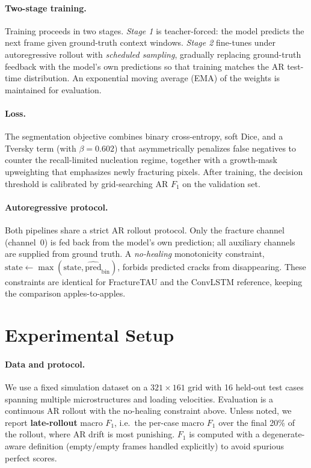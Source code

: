 \documentclass[11pt]{article}
\begin{document}
\paragraph{Two-stage training.}
Training proceeds in two stages. \emph{Stage 1} is teacher-forced: the model
predicts the next frame given ground-truth context windows. \emph{Stage 2}
fine-tunes under autoregressive rollout with \emph{scheduled sampling}, gradually
replacing ground-truth feedback with the model's own predictions so that training
matches the AR test-time distribution. An exponential moving average (EMA) of the
weights is maintained for evaluation.

\paragraph{Loss.}
The segmentation objective combines binary cross-entropy, soft Dice, and a
Tversky term (with $\beta = 0.602$) that asymmetrically penalizes false negatives
to counter the recall-limited nucleation regime, together with a growth-mask
upweighting that emphasizes newly fracturing pixels. After training, the decision
threshold is calibrated by grid-searching AR $F_1$ on the validation set.

\paragraph{Autoregressive protocol.}
Both pipelines share a strict AR rollout protocol. Only the fracture channel
(channel~0) is fed back from the model's own prediction; all auxiliary channels
are supplied from ground truth. A \emph{no-healing} monotonicity constraint,
$\text{state} \leftarrow \max(\text{state}, \widehat{\text{pred}}_{\text{bin}})$,
forbids predicted cracks from disappearing. These constraints are identical for
FractureTAU and the ConvLSTM reference, keeping the comparison apples-to-apples.

\section{Experimental Setup}
\label{sec:setup}

\paragraph{Data and protocol.}
We use a fixed simulation dataset on a $321\times161$ grid with 16 held-out test
cases spanning multiple microstructures and loading velocities. Evaluation is a
continuous AR rollout with the no-healing constraint above. Unless noted, we
report \textbf{late-rollout} macro $F_1$, i.e.\ the per-case macro $F_1$ over the
final 20\% of the rollout, where AR drift is most punishing. $F_1$ is computed
with a degenerate-aware definition (empty/empty frames handled explicitly) to
avoid spurious perfect scores.
\end{document}
